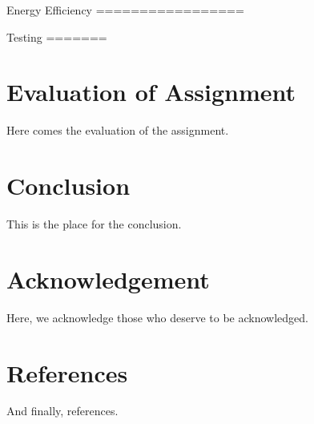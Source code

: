 \documentclass{article}
\begin{document}
Energy Efficiency
=================

Testing
=======

\part{Evaluation of Assignment}

Here comes the evaluation of the assignment.

\part{Conclusion}

This is the place for the conclusion.

\part{Acknowledgement}

Here, we acknowledge those who deserve to be acknowledged.

\part{References}

And finally, references.
\end{document}
